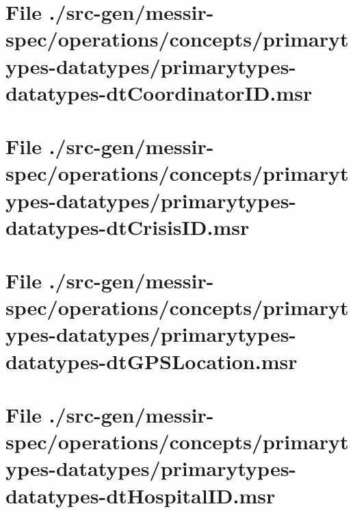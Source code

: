 \section[File /src-gen/messir-spec.../primarytypes-datatypes-dtCoordinatorID.msr]{File ./src-gen/messir-spec/operations/concepts/primarytypes-datatypes/primarytypes-datatypes-dtCoordinatorID.msr}
\scriptsize

\normalsize
	
\section[File /src-gen/messir-spec/operations.../primarytypes-datatypes-dtCrisisID.msr]{File ./src-gen/messir-spec/operations/concepts/primarytypes-datatypes/primarytypes-datatypes-dtCrisisID.msr}
\scriptsize

\normalsize
	
\section[File /src-gen/messir-spec.../primarytypes-datatypes-dtGPSLocation.msr]{File ./src-gen/messir-spec/operations/concepts/primarytypes-datatypes/primarytypes-datatypes-dtGPSLocation.msr}
\scriptsize

\normalsize
	
\section[File /src-gen/messir-spec/operations.../primarytypes-datatypes-dtHospitalID.msr]{File ./src-gen/messir-spec/operations/concepts/primarytypes-datatypes/primarytypes-datatypes-dtHospitalID.msr}
\scriptsize

\normalsize
	
